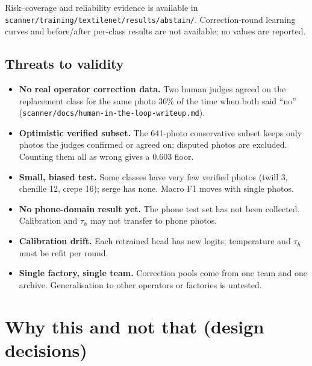 \documentclass[11pt,a4paper]{article}
\begin{document}
Risk--coverage and reliability evidence is available in
\texttt{scanner/training/textilenet/results/abstain/}. Correction-round learning
curves and before/after per-class results are not available; no values are reported.

\subsection{Threats to validity}

\begin{itemize}[leftmargin=*]
  \item \textbf{No real operator correction data.} Two human judges agreed on the
        replacement class for the same photo 36\% of the time when both said ``no''
        (\texttt{scanner/docs/human-in-the-loop-writeup.md}).
  \item \textbf{Optimistic verified subset.} The 641-photo conservative subset keeps only
        photos the judges confirmed or agreed on; disputed photos are excluded. Counting
        them all as wrong gives a 0.603 floor.
  \item \textbf{Small, biased test.} Some classes have very few verified photos (twill 3,
        chenille 12, crepe 16); serge has none. Macro F1 moves with single photos.
  \item \textbf{No phone-domain result yet.} The phone test set has not been collected.
        Calibration and $\tau_h$ may not transfer to phone photos.
  \item \textbf{Calibration drift.} Each retrained head has new logits; temperature and
        $\tau_h$ must be refit per round.
  \item \textbf{Single factory, single team.} Correction pools come from one team and one
        archive. Generalisation to other operators or factories is untested.
\end{itemize}

\section{Why this and not that (design decisions)}
\end{document}
